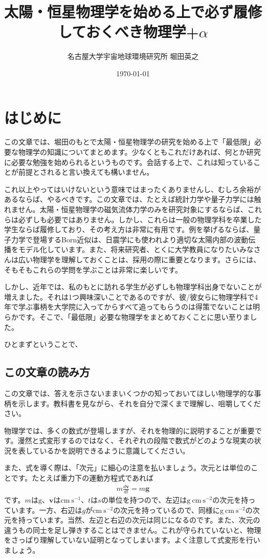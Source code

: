 \documentclass{ltjarticle}
\title{太陽・恒星物理学を始める上で必ず履修しておくべき物理学+$\alpha$}
\author{名古屋大学宇宙地球環境研究所 堀田英之}
\date{\today}
\begin{document}
\maketitle
\section{はじめに}
この文章では、堀田のもとで太陽・恒星物理学の研究を始める上で「最低限」必要な物理学の知識についてまとめます。少なくともこれだけあれば、何とか研究に必要な勉強を始められるというものです。会話する上で、これは知っていることが前提とされると言い換えても構いません。\par
これ以上やってはいけないという意味ではまったくありませんし、むしろ余裕があるならば、やるべきです。この文章では、たとえば統計力学や量子力学には触れません。太陽・恒星物理学の磁気流体力学のみを研究対象にするならば、これらは必ずしも必要ではありません。しかし、これらは一般の物理学科を卒業した学生ならば履修しており、その考え方は非常に有用です。例を挙げるならば、量子力学で登場するBorn近似は、日震学にも使われより適切な太陽内部の波動伝播をモデル化しています。また、将来研究者、とくに大学教員になりたいみなさんは広い物理学を理解しておくことは、採用の際に重要となります。さらには、そもそもこれらの学問を学ぶことは非常に楽しいです。
\par
しかし、近年では、私のもとに訪れる学生が必ずしも物理学科出身でないことが増えました。それは1つ興味深いことであるのですが、彼/彼女らに物理学科で4年で学ぶ事柄を大学院に入ってからすべて追ってもらうのは得策でないことは明らかです。そこで、「最低限」必要な物理学をまとめておくことに思い至りました。
\par
ひとまずということで、

\subsection{この文章の読み方}
この文章では、答えを示さないままいくつかの知っておいてほしい物理学的な事柄を示します。教科書を見ながら、それを自分で深くまで理解し、咀嚼してください。\par
物理学では、多くの数式が登場しますが、それを物理的に説明することが重要です。漫然と式変形するのではなく、それぞれの段階で数式がどのような現実の状況を表しているかを説明できるように意識してください。\par
また、式を導く際は、「次元」に細心の注意を払いましょう。次元とは単位のことです。たとえば重力下の運動方程式であれば
\begin{align}
    m\frac{d\bm{v}}{dt} = m \bm{g}
\end{align}
です。$m$は$\mathrm{g}$、$\bm{v}$は$\mathrm{cm~s^{-1}}$、$t$は$s$の単位を持つので、左辺は$\mathrm{g~cm~s^{-2}}$の次元を持っています。一方、右辺は$g$が$\mathrm{cm~s^{-2}}$の次元を持っているので、同様に$\mathrm{g~cm~s^{-2}}$の次元を持っています。当然、左辺と右辺の次元は同じになるのです。また、次元の違うもの同士を足し弾きすることはできません。これが守られていないと、物理をさっぱり理解していない証明となってしまいます。よく注意して式変形を行いましょう。
\end{document}
